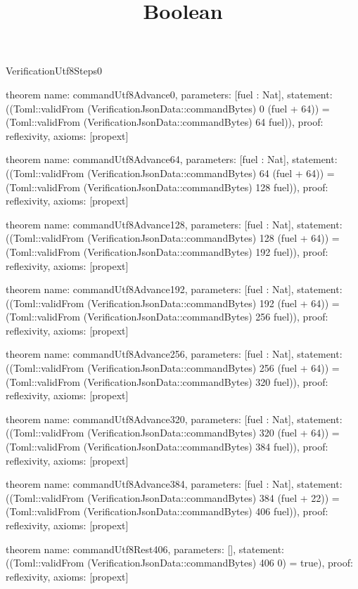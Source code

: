 \begin{lexlean}{VerificationUtf8Steps0}
\title{Boolean}
\begin{semanticmodule}

theorem{
  name: commandUtf8Advance0,
  parameters: [fuel : Nat],
  statement: ((Toml::validFrom (VerificationJsonData::commandBytes) 0 (fuel + 64)) = (Toml::validFrom (VerificationJsonData::commandBytes) 64 fuel)),
  proof: reflexivity{},
  axioms: [propext]
}

theorem{
  name: commandUtf8Advance64,
  parameters: [fuel : Nat],
  statement: ((Toml::validFrom (VerificationJsonData::commandBytes) 64 (fuel + 64)) = (Toml::validFrom (VerificationJsonData::commandBytes) 128 fuel)),
  proof: reflexivity{},
  axioms: [propext]
}

theorem{
  name: commandUtf8Advance128,
  parameters: [fuel : Nat],
  statement: ((Toml::validFrom (VerificationJsonData::commandBytes) 128 (fuel + 64)) = (Toml::validFrom (VerificationJsonData::commandBytes) 192 fuel)),
  proof: reflexivity{},
  axioms: [propext]
}

theorem{
  name: commandUtf8Advance192,
  parameters: [fuel : Nat],
  statement: ((Toml::validFrom (VerificationJsonData::commandBytes) 192 (fuel + 64)) = (Toml::validFrom (VerificationJsonData::commandBytes) 256 fuel)),
  proof: reflexivity{},
  axioms: [propext]
}

theorem{
  name: commandUtf8Advance256,
  parameters: [fuel : Nat],
  statement: ((Toml::validFrom (VerificationJsonData::commandBytes) 256 (fuel + 64)) = (Toml::validFrom (VerificationJsonData::commandBytes) 320 fuel)),
  proof: reflexivity{},
  axioms: [propext]
}

theorem{
  name: commandUtf8Advance320,
  parameters: [fuel : Nat],
  statement: ((Toml::validFrom (VerificationJsonData::commandBytes) 320 (fuel + 64)) = (Toml::validFrom (VerificationJsonData::commandBytes) 384 fuel)),
  proof: reflexivity{},
  axioms: [propext]
}

theorem{
  name: commandUtf8Advance384,
  parameters: [fuel : Nat],
  statement: ((Toml::validFrom (VerificationJsonData::commandBytes) 384 (fuel + 22)) = (Toml::validFrom (VerificationJsonData::commandBytes) 406 fuel)),
  proof: reflexivity{},
  axioms: [propext]
}

theorem{
  name: commandUtf8Rest406,
  parameters: [],
  statement: ((Toml::validFrom (VerificationJsonData::commandBytes) 406 0) = true),
  proof: reflexivity{},
  axioms: [propext]
}

\end{semanticmodule}
\end{lexlean}
